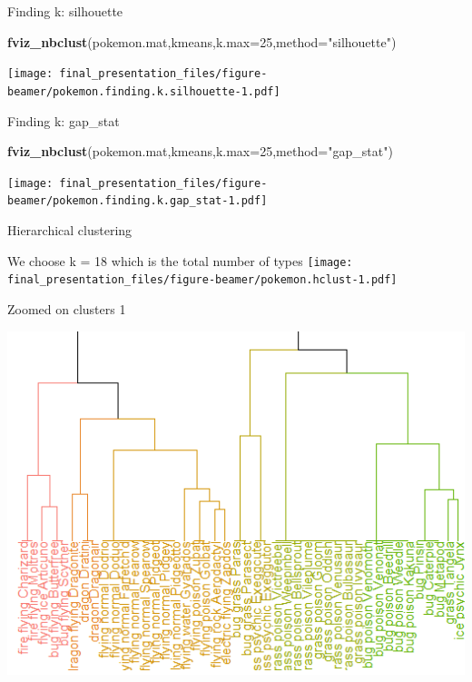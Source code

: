 \documentclass[
  ignorenonframetext,
]{beamer}
\newenvironment{Shaded}{\begin{snugshade}}{\end{snugshade}}
\newcommand{\DataTypeTok}[1]{\textcolor[rgb]{0.13,0.29,0.53}{#1}}
\newcommand{\DecValTok}[1]{\textcolor[rgb]{0.00,0.00,0.81}{#1}}
\newcommand{\KeywordTok}[1]{\textcolor[rgb]{0.13,0.29,0.53}{\textbf{#1}}}
\newcommand{\NormalTok}[1]{#1}
\newcommand{\StringTok}[1]{\textcolor[rgb]{0.31,0.60,0.02}{#1}}
\begin{document}
\begin{frame}[fragile]{Finding k: silhouette}
\protect\hypertarget{finding-k-silhouette}{}

\begin{Shaded}
\begin{Highlighting}[]
\KeywordTok{fviz_nbclust}\NormalTok{(pokemon.mat,kmeans,}\DataTypeTok{k.max=}\DecValTok{25}\NormalTok{,}\DataTypeTok{method=}\StringTok{"silhouette"}\NormalTok{)}
\end{Highlighting}
\end{Shaded}

\texttt{[image: final\_presentation\_files/figure-beamer/pokemon.finding.k.silhouette-1.pdf]}

\end{frame}

\begin{frame}[fragile]{Finding k: gap\_stat}
\protect\hypertarget{finding-k-gap_stat}{}

\begin{Shaded}
\begin{Highlighting}[]
\KeywordTok{fviz_nbclust}\NormalTok{(pokemon.mat,kmeans,}\DataTypeTok{k.max=}\DecValTok{25}\NormalTok{,}\DataTypeTok{method=}\StringTok{"gap_stat"}\NormalTok{)}
\end{Highlighting}
\end{Shaded}

\texttt{[image: final\_presentation\_files/figure-beamer/pokemon.finding.k.gap\_stat-1.pdf]}

\end{frame}

\begin{frame}{Hierarchical clustering}
\protect\hypertarget{hierarchical-clustering}{}

We choose k = 18 which is the total number of types
\texttt{[image: final\_presentation\_files/figure-beamer/pokemon.hclust-1.pdf]}

\end{frame}

\begin{frame}{Zoomed on clusters 1}
\protect\hypertarget{zoomed-on-clusters-1}{}

\includegraphics{pokemon_dend_01.PNG}

\end{frame}
\end{document}
